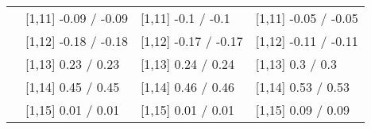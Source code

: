 \begin{table}
\begin{tabular}[t]{llll}
 & {}[1,11] -0.09  / -0.09 & {}[1,11] -0.1  / -0.1 & {}[1,11] -0.05  / -0.05\\
 & {}[1,12] -0.18  / -0.18 & {}[1,12] -0.17  / -0.17 & {}[1,12] -0.11  / -0.11\\
\addlinespace
 & {}[1,13] 0.23  / 0.23 & {}[1,13] 0.24  / 0.24 & {}[1,13] 0.3  / 0.3\\
 & {}[1,14] 0.45  / 0.45 & {}[1,14] 0.46  / 0.46 & {}[1,14] 0.53  / 0.53\\
 & {}[1,15] 0.01  / 0.01 & {}[1,15] 0.01  / 0.01 & {}[1,15] 0.09  / 0.09\\
\bottomrule
\end{tabular}
\end{table}
